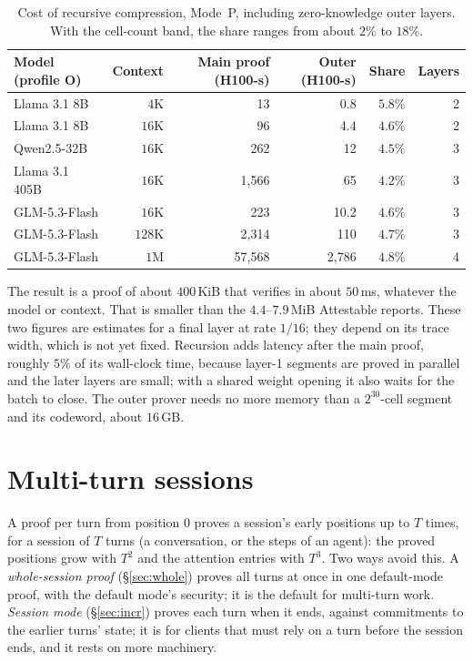 \documentclass[11pt]{article}
\begin{document}
\begin{table}[h]
\centering\small
\begin{tabular}{@{}lrrrrr@{}}
\toprule
Model (profile O) & Context & Main proof (H100-s) & Outer (H100-s) & Share & Layers \\
\midrule
Llama 3.1 8B & \(4\)K & 13 & 0.8 & \(5.8\%\) & 2 \\
Llama 3.1 8B & \(16\)K & 96 & 4.4 & \(4.6\%\) & 2 \\
Qwen2.5-32B & \(16\)K & 262 & 12 & \(4.5\%\) & 3 \\
Llama 3.1 405B & \(16\)K & 1{,}566 & 65 & \(4.2\%\) & 3 \\
GLM-5.3-Flash & \(16\)K & 223 & 10.2 & \(4.6\%\) & 3 \\
GLM-5.3-Flash & \(128\)K & 2{,}314 & 110 & \(4.7\%\) & 3 \\
GLM-5.3-Flash & \(1\)M & 57{,}568 & 2{,}786 & \(4.8\%\) & 4 \\
\bottomrule
\end{tabular}
\caption{Cost of recursive compression, Mode~P, including zero-knowledge outer layers. With the cell-count band, the share ranges from about \(2\%\) to \(18\%\).}
\label{tab:rec}
\end{table}

The result is a proof of about \(400\)\,KiB that verifies in about \(50\)\,ms, whatever the model or context.
That is smaller than the \(4.4\)--\(7.9\)\,MiB Attestable reports.
These two figures are estimates for a final layer at rate \(1/16\); they depend on its trace width, which is not yet fixed.
Recursion adds latency after the main proof, roughly \(5\%\) of its wall-clock time, because layer-1 segments are proved in parallel and the later layers are small; with a shared weight opening it also waits for the batch to close.
The outer prover needs no more memory than a \(2^{30}\)-cell segment and its codeword, about \(16\)\,GB.

\section{Multi-turn sessions}
\label{sec:session}

A proof per turn from position \(0\) proves a session's early positions up to \(T\) times, for a session of \(T\) turns (a conversation, or the steps of an agent): the proved positions grow with \(T^2\) and the attention entries with \(T^3\).
Two ways avoid this.
A \emph{whole-session proof} (\S\ref{sec:whole}) proves all turns at once in one default-mode proof, with the default mode's security; it is the default for multi-turn work.
\emph{Session mode} (\S\ref{sec:incr}) proves each turn when it ends, against commitments to the earlier turns' state; it is for clients that must rely on a turn before the session ends, and it rests on more machinery.
\end{document}

